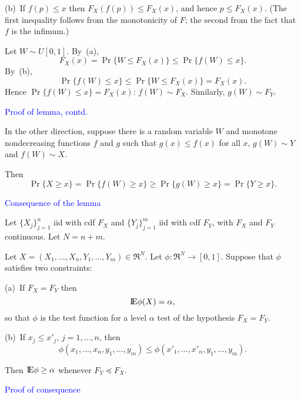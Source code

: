 \documentclass[landscape]{slides}
\newcommand{\EE}{\hbox{I\kern-.1667em\hbox{E}}}
\newcommand{\beq}{\begin{equation}}
\newcommand{\eeq}{\end{equation}}
\begin{document}
\begin{slide}
\begin{slide}
(b)~If $f(p) \le x$ then $F_X(f(p)) \le F_X(x)$, and hence $p \le F_X(x)$.
(The first inequality follows from the monotonicity of $F$; the second
from the fact that $f$ is the infimum.)

Let $W \sim U[0, 1]$.
By~(a),
\beq
   F_X(x) = \Pr \{ W \le F_X(x) \} \le \Pr \{ f(W)  \le x \}.
\eeq
By~(b),
\beq
   \Pr \{ f(W) \le x \} \le \Pr \{ W \le F_X(x) \} = F_X(x).
\eeq
Hence $\Pr \{ f(W) \le x \}  = F_X(x)$: $f(W) \sim F_X$.
Similarly, $g(W) \sim F_Y$.
 
\end{slide}

\begin{slide}
{\textcolor{blue}{Proof of lemma, contd.}}

In the other direction, suppose there is a random variable
$W$ and monotone nondecreasing functions $f$ and $g$ such that
$g(x) \le f(x)$ for all $x$, $g(W) \sim Y$ and $f(W) \sim X$.

Then 
\beq
    \Pr \{ X \ge x \} = \Pr \{ f(W) \ge x \} \ge \Pr \{ g(W) \ge x \} = \Pr \{ Y \ge x \}.
\eeq


\end{slide}

\begin{slide}
{\textcolor{blue}{Consequence of the lemma}}

Let $\{X_j\}_{j=1}^n$ iid with cdf $F_X$ and $\{Y_j\}_{j=1}^m$ iid with cdf $F_Y$,
with $F_X$ and $F_Y$ continuous.  Let $N = n+m$.

Let $X = (X_1, \ldots, X_n, Y_1, \ldots, Y_m) \in \Re^N$.
Let 
$\phi: \Re^N \rightarrow [0, 1]$.
Suppose that $\phi$ satisfies two constraints:

(a)~If $F_X = F_Y$ then
\beq
   \EE \phi(X) = \alpha,
\eeq
so that $\phi$ is the test function for a level $\alpha$ test of the
hypothesis $F_X = F_Y$.

(b)~If $x_j \le x'_j$, $j = 1, \ldots, n$, then
\beq
    \phi(x_1, \ldots, x_n, y_1, \ldots, y_m) \le \phi(x'_1, \ldots, x'_n, y_1, \ldots, y_m).
\eeq

Then $\EE \phi \ge \alpha$ whenever $F_Y \preceq F_X$.

\end{slide}

\begin{slide}
{\textcolor{blue}{Proof of consequence}}


\end{slide}
\end{slide}
\end{document}
